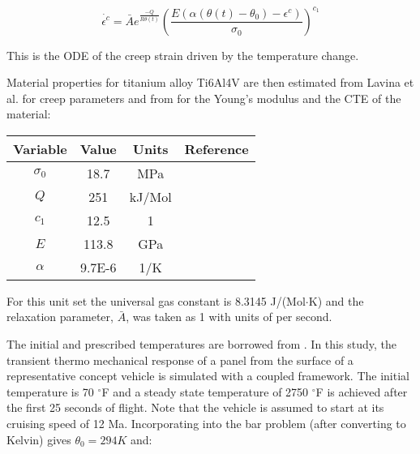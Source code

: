 \documentclass[conf]{new-aiaa}
\begin{document}
\begin{equation} \label{eq_creep_ode}
\dot{\epsilon^c} = \bar{A} e^{\frac{-Q}{R \theta(t)}} \left( \frac{E ( \alpha (\theta(t) - \theta_0) - \epsilon^c)}{\sigma_0} \right)^{c_1}
\end{equation}

This is the ODE of the creep strain driven by the temperature change.

Material properties for titanium alloy Ti6Al4V are then estimated from
Lavina et al. \cite{ lavina_creep_behavior_of_Ti6Al4V_from_450C_to_600C}
for creep parameters and from \cite{
boyer_materials_properties_handbook_titanium_alloys}
for the Young's modulus and the CTE of the material:

\begin{center}
\begin{tabular}{|c|c|c|c|}
\hline
Variable & Value & Units & Reference \\
\hline
$\sigma_0$ & 18.7  & MPa   & \cite{lavina_creep_behavior_of_Ti6Al4V_from_450C_to_600C} \\
$Q$      & 251     & kJ/Mol& \cite{lavina_creep_behavior_of_Ti6Al4V_from_450C_to_600C} \\
$c_1$    & 12.5    & 1     & \cite{lavina_creep_behavior_of_Ti6Al4V_from_450C_to_600C} \\
$E$      & 113.8   & GPa   & \cite{ boyer_materials_properties_handbook_titanium_alloys} \\
$\alpha$ & 9.7E-6  & 1/K   & \cite{ boyer_materials_properties_handbook_titanium_alloys} \\
\hline
\end{tabular}
\end{center}

For this unit set the universal gas constant is 8.3145 J/(Mol$\cdot$K)
and the relaxation parameter, $\bar{A}$, was taken as 1 with units of per second.

The initial and prescribed temperatures are borrowed from 
\cite{ culler_impact_of_FTS_coupling_on_response_prediction_hypersonic_skin_panels}.
In this study, the transient thermo mechanical response of a panel from the 
surface of a representative concept vehicle is simulated with a coupled framework.
The initial temperature is 70 $^{\circ}$F and a steady state temperature 
of 2750 $^{\circ}$F is achieved after the first 25 seconds of flight.
Note that the vehicle is assumed to start at its cruising speed of 12 Ma.
Incorporating into the bar problem (after converting to Kelvin) 
gives $\theta_0 = 294 K$ and:
\end{document}
